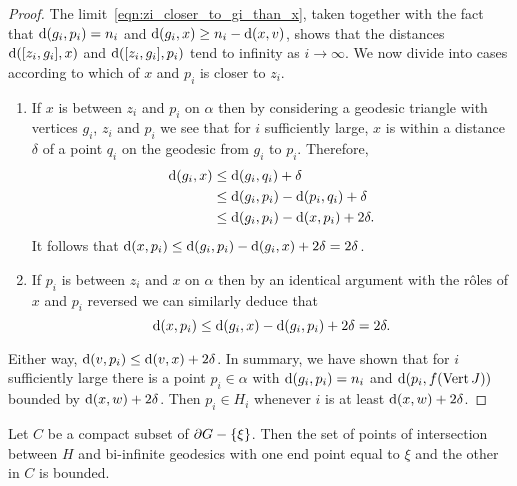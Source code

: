\documentclass[a4paper]{article}
\begin{document}
\begin{proof}
  The limit~\eqref{eqn:zi_closer_to_gi_than_x}, taken together with the fact
  that $\operatorname{d}(g_i, p_i) = n_i$ and $\operatorname{d}(g_i, x) \geq n_i - \operatorname{d}(x, v)$,
  shows that the distances $\operatorname{d}([z_i, g_i], x)$ and $\operatorname{d}([z_i, g_i], p_i)$
  tend to infinity as $i\to\infty$.  We now divide into cases according to
  which of $x$ and $p_i$ is closer to $z_i$.
  \begin{enumerate}
    \item If $x$ is between $z_i$ and $p_i$ on $\alpha$ then by considering a
      geodesic triangle with vertices $g_i$, $z_i$ and $p_i$ we see that for
      $i$ sufficiently large, $x$ is within a distance $\delta$ of a point
      $q_i$ on the geodesic from $g_i$ to $p_i$.  Therefore,
      \begin{align*}
        \operatorname{d}(g_i,x)&\leq \operatorname{d}(g_i,q_i)+\delta\\
                        &\leq \operatorname{d}(g_i,p_i)-\operatorname{d}(p_i,q_i)+\delta\\
                        &\leq \operatorname{d}(g_i,p_i)-\operatorname{d}(x,p_i)+2\delta.
      \end{align*}
      It follows that $\operatorname{d}(x,p_i) \leq \operatorname{d}(g_i,p_i)-\operatorname{d}(g_i,x)+2\delta
      = 2\delta$.
    \item If $p_i$ is between $z_i$ and $x$ on $\alpha$ then by an identical 
      argument with the r\^oles of $x$ and $p_i$ reversed we can similarly 
      deduce that 
      \begin{equation*}
        \operatorname{d}(x,p_i)\leq\operatorname{d}(g_i,x) - \operatorname{d}(g_i,p_i) + 2\delta =2\delta.
      \end{equation*}
  \end{enumerate}

  Either way, $\operatorname{d}(v, p_i) \leq \operatorname{d}(v, x) + 2\delta$. In summary, we have
  shown that for $i$ sufficiently large there is a point $p_i\in\alpha$ with
  $\operatorname{d}(g_i,p_i)=n_i$ and $\operatorname{d}(p_i,f(\operatorname{Vert} J))$ bounded by $\operatorname{d}(x,w) +
  2\delta$. Then $p_i \in H_i$ whenever $i$ is at least $\operatorname{d}(x,w) + 2\delta$.
\end{proof}

\begin{lemma}\label{lem:bounded_intersection}
  Let $C$ be a compact subset of $\partial G - \left\{\xi\right\}$. Then the set of points 
  of intersection between $H$ and bi-infinite geodesics with one end point equal 
  to $\xi$ and the other in $C$ is bounded.
\end{lemma}
\end{document}
